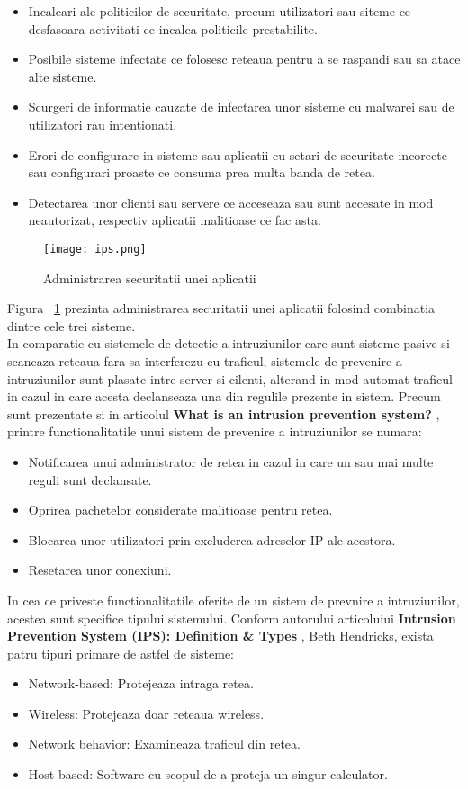 \begin{itemize}
	\item Incalcari ale politicilor de securitate, precum utilizatori sau siteme ce desfasoara activitati ce incalca politicile prestabilite.
	\item Posibile sisteme infectate ce folosesc reteaua pentru a se raspandi sau sa atace alte sisteme.
	\item Scurgeri de informatie cauzate de infectarea unor sisteme cu malwarei sau de utilizatori rau intentionati.
	\item Erori de configurare in sisteme sau aplicatii cu setari de securitate incorecte sau configurari proaste ce consuma prea multa banda de retea.
	\item Detectarea unor clienti sau servere ce acceseaza sau sunt accesate in mod neautorizat, respectiv aplicatii malitioase ce fac asta.
\end{itemize}
\begin{figure}[h]
	\centering
	\texttt{[image: ips.png]}
	\caption{Administrarea securitatii unei aplicatii}
	\label{fig:ips-example}
\end{figure}

Figura ~\ref{fig:ips-example} prezinta administrarea securitatii unei aplicatii folosind combinatia dintre cele trei sisteme. \\

In comparatie cu sistemele de detectie a intruziunilor care sunt sisteme pasive si scaneaza reteaua fara sa interferezu cu traficul, sistemele de prevenire a intruziunilor sunt plasate intre server si cilenti, alterand in mod automat traficul in cazul in care acesta declanseaza una din regulile prezente in sistem. Precum sunt prezentate si in articolul \textbf{What is an intrusion prevention system?} \cite{what_is_ips}, printre functionalitatile unui sistem de prevenire a intruziunilor se numara:
\begin{itemize}
	\item Notificarea unui administrator de retea in cazul in care un sau mai multe reguli sunt declansate.
	\item Oprirea pachetelor considerate malitioase pentru retea.
	\item Blocarea unor utilizatori prin excluderea adreselor IP ale acestora.
	\item Resetarea unor conexiuni.
\end{itemize}

In cea ce priveste functionalitatile oferite de un sistem de prevnire a intruziunilor, acestea sunt specifice tipului sistemului. Conform autorului articoluiui \textbf{Intrusion Prevention System (IPS): Definition \& Types} \cite{ips_types}, Beth Hendricks, exista patru tipuri primare de astfel de sisteme:
\begin{itemize}
	\item Network-based: Protejeaza intraga retea.
	\item Wireless: Protejeaza doar reteaua wireless.
	\item Network behavior: Examineaza traficul din retea.
	\item Host-based: Software cu scopul de a proteja un singur calculator.
\end{itemize}

